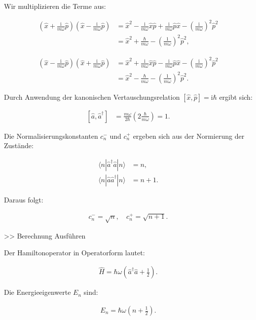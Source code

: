 \documentclass[11pt,a4paper]{article}
\begin{document}
Wir multiplizieren die Terme aus:

\begin{align*}
\left(\hat{x} + \frac{\mathrm{i}}{m \omega} \hat{p}\right)\left(\hat{x} - \frac{\mathrm{i}}{m \omega} \hat{p}\right) &= \hat{x}^2 - \frac{\mathrm{i}}{m \omega} \hat{x}\hat{p} + \frac{\mathrm{i}}{m \omega} \hat{p}\hat{x} - \left(\frac{\mathrm{i}}{m \omega}\right)^2 \hat{p}^2 \\
&= \hat{x}^2 + \frac{\hbar}{m \omega} - \left(\frac{1}{m \omega}\right)^2 \hat{p}^2,
\end{align*}

\begin{align*}
\left(\hat{x} - \frac{\mathrm{i}}{m \omega} \hat{p}\right)\left(\hat{x} + \frac{\mathrm{i}}{m \omega} \hat{p}\right) &= \hat{x}^2 + \frac{\mathrm{i}}{m \omega} \hat{x}\hat{p} - \frac{\mathrm{i}}{m \omega} \hat{p}\hat{x} - \left(\frac{\mathrm{i}}{m \omega}\right)^2 \hat{p}^2 \\
&= \hat{x}^2 - \frac{\hbar}{m \omega} - \left(\frac{1}{m \omega}\right)^2 \hat{p}^2.
\end{align*}

Durch Anwendung der kanonischen Vertauschungsrelation $\left[\hat{x}, \hat{p}\right] = \mathrm{i} \hbar$ ergibt sich:

\begin{align*}
\left[\hat{a}, \hat{a}^{\dagger}\right] &= \frac{m \omega}{2 \hbar} \left(2 \frac{\hbar}{m \omega}\right) = 1.
\end{align*}

Die Normalisierungskonstanten $c_n^{-}$ und $c_n^{+}$ ergeben sich aus der Normierung der Zustände:

\begin{align*}
\langle n | \hat{a}^{\dagger} \hat{a} | n \rangle &= n, \\
\langle n | \hat{a} \hat{a}^{\dagger} | n \rangle &= n + 1.
\end{align*}

Daraus folgt:

\begin{align*}
c_n^{-} = \sqrt{n}, \quad c_n^{+} = \sqrt{n+1}.
\end{align*}


>> Berechnung Ausführen


Der Hamiltonoperator in Operatorform lautet:

\begin{align*}
\hat{H} = \hbar \omega \left(\hat{a}^{\dagger} \hat{a} + \frac{1}{2}\right).
\end{align*}

Die Energieeigenwerte $E_n$ sind:

\begin{align*}
E_n = \hbar \omega \left(n + \frac{1}{2}\right).
\end{align*}

\end{document}

